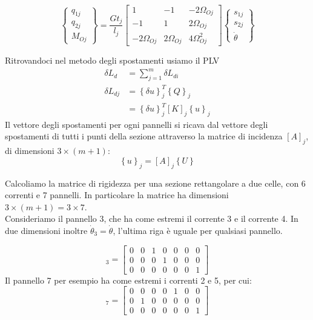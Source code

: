 \begin{equation*}
\left\{
\begin{array}{c}
q_{1j}\\
q_{2j} \\
M_{Oj}
\end{array}
\right\}
=
\frac{Gt_j}{l_j}
\begin{bmatrix}
1 & -1 & -2\Omega_{Oj} \\
-1 & 1 & 2\Omega_{Oj} \\
-2\Omega_{Oj} & 2\Omega_{Oj} & 4\Omega_{Oj}^2
\end{bmatrix}
\left\{
\begin{array}{c}
s_{1j} \\
s_{2j} \\
\dot{\theta}
\end{array}
\right\}
\end{equation*}

Ritrovandoci nel metodo degli spostamenti usiamo il PLV
\begin{align*}
    \delta L_d  &= \sum_{j=1}^m \delta L_{di} \\
   \delta L_{dj}   &=\left\{\delta u\right\}_j^T   \left\{ Q\right\}_j\\
        &=\left\{\delta u\right\}_j^T  [K]_j  \left\{u\right\}_j
\end{align*}
Il vettore degli spostamenti per ogni pannelli si ricava dal vettore degli spostamenti di tutti i punti della sezione attraverso la matrice di incidenza $[A]_j$, di dimensioni $3\times(m+1)$:
\begin{equation*}
    \left\{ u\right\}_j = [A]_j  \left\{U\right\}
\end{equation*}

\begin{esempioBox}
    Calcoliamo la matrice di rigidezza per una sezione rettangolare a due celle, con 6 correnti e 7 pannelli. In particolare la matrice ha dimensioni $3\times(m+1)=3\times7$. \\
    Consideriamo il pannello 3, che ha come estremi il corrente 3 e il corrente 4. In due dimensioni inoltre $\dot{\theta}_3=\dot{\theta}$, l'ultima riga è uguale per qualsiasi pannello.

    \begin{equation*}
[A]_3 = \begin{bmatrix}
0 & 0 & 1 & 0 & 0 & 0 & 0 \\
0 & 0 & 0 & 1 & 0 & 0 & 0 \\
0 & 0 & 0 & 0 & 0 & 0 & 1
\end{bmatrix}
\end{equation*}
Il pannello 7 per esempio ha come estremi i correnti 2 e 5, per cui:
 \begin{equation*}
[A]_7 = \begin{bmatrix}
0 & 0 & 0 & 0 & 1 & 0 & 0 \\
0 & 1 & 0 & 0 & 0 & 0 & 0 \\
0 & 0 & 0 & 0 & 0 & 0 & 1
\end{bmatrix}
\end{equation*}
    
\end{esempioBox}

